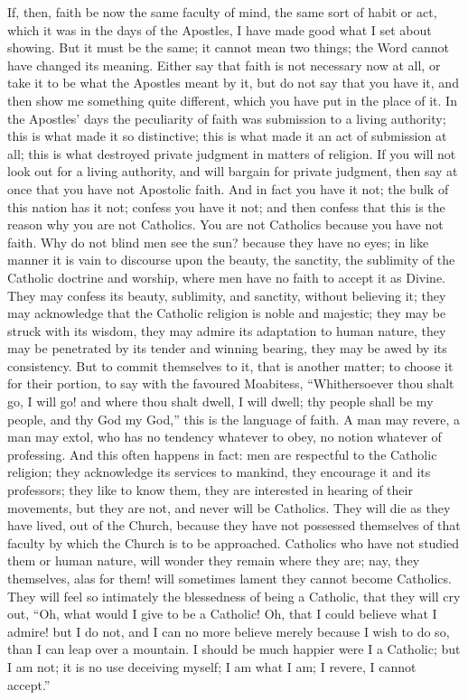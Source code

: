 If, then, faith be now the same faculty of mind, the same sort of
habit or act, which it was in the days of the Apostles, I have made
good what I set about showing. But it must be the same; it cannot mean
two things; the Word cannot have changed its meaning. Either say that
faith is not necessary now at all, or take it to be what the Apostles
meant by it, but do not say that you have it, and then show me
something quite different, which you have put in the place of it. In
the Apostles' days the peculiarity of faith was submission to a living
authority; this is what made it so distinctive; this is what made it
an act of submission at all; this is what destroyed private judgment
in matters of religion. If you will not look out for a living
authority, and will bargain for private judgment, then say at once
that you have not Apostolic faith. And in fact you have it not; the
bulk of this nation has it not; confess you have it not; and then
confess that this is the reason why you are not Catholics. You are not
Catholics because you have not faith. Why do not blind men see the
sun? because they have no eyes; in like manner it is vain to discourse
upon the beauty, the sanctity, the sublimity of the Catholic doctrine
and worship, where men have no faith to accept it as Divine. They may
confess its beauty, sublimity, and sanctity, without believing it;
they may acknowledge that the Catholic religion is noble and majestic;
they may be struck with its wisdom, they may admire its adaptation to
human nature, they may be penetrated by its tender and winning
bearing, they may be awed by its consistency. But to commit themselves
to it, that is another matter; to choose it for their portion, to say
with the favoured Moabitess, ``Whithersoever thou shalt go, I will
go! and where thou shalt dwell, I will dwell; thy people shall be my
people, and thy God my God,'' this is the language of faith. A man
may revere, a man may extol, who has no tendency whatever to obey, no
notion whatever of professing. And this often happens in fact: men are
respectful to the Catholic religion; they acknowledge its services to
mankind, they encourage it and its professors; they like to know them,
they are interested in hearing of their movements, but they are not,
and never will be Catholics. They will die as they have lived, out of
the Church, because they have not possessed themselves of that faculty
by which the Church is to be approached. Catholics who have not
studied them or human nature, will wonder they remain where they are;
nay, they themselves, alas for them! will sometimes lament they cannot
become Catholics. They will feel so intimately the blessedness of
being a Catholic, that they will cry out, ``Oh, what would I give
to be a Catholic! Oh, that I could believe what I admire! but I do
not, and I can no more believe merely because I wish to do so, than I
can leap over a mountain. I should be much happier were I a Catholic;
but I am not; it is no use deceiving myself; I am what I am; I revere,
I cannot accept.''

